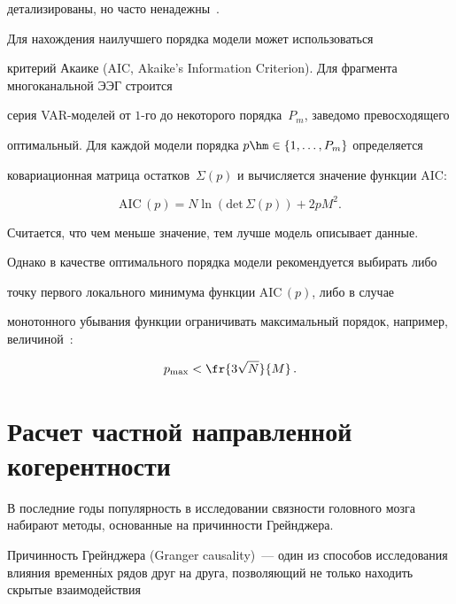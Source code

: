 детализированы, но часто ненадежны~\cite{kur}.





Для нахождения наилучшего порядка модели может использоваться


критерий Акаике (AIC, Akaike's Information Criterion). Для фрагмента многоканальной ЭЭГ строится


серия VAR-мо\-де\-лей от $1$-го до некоторого порядка~$P_m$, заведомо превосходящего


оптимальный. Для каждой модели порядка $p \hm\in \{1, \ldots ,P_m \}$ определяется


ковариационная матрица остатков~$\Sigma(p)$ и вычисляется значение функции $\mathrm{AIC}$:


$$


\mathrm{AIC}\,(p) = N \ln\left( \mathrm{det}\, \Sigma(p)\right) + 2 p M^2 .


$$


Считается, что чем меньше значение, тем лучше модель описывает данные. 


Однако в качестве оптимального порядка модели рекомендуется выбирать либо 


точку первого локального минимума функции $\mathrm{AIC}\,(p)$, либо в случае 


монотонного убывания функции ограничивать максимальный порядок, например, величиной~\cite{marp}:


\begin{equation}


\label{lim}


p_{\max} < \fr{3\sqrt{N}}{M}\,.


\end{equation}





\section{Расчет частной направленной когерентности}





В последние годы популярность в исследовании связности головного мозга набирают методы, основанные на причинности Грейнджера.


Причинность Грейн\-дже\-ра (Granger causality)~--- один из способов исследования влияния временн$\acute{\mbox{ы}}$х рядов друг на друга, позволяющий не только находить скрытые взаимодействия


